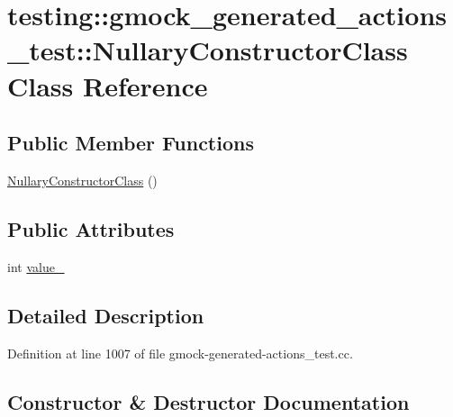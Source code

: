 \hypertarget{classtesting_1_1gmock__generated__actions__test_1_1_nullary_constructor_class}{}\section{testing\+:\+:gmock\+\_\+generated\+\_\+actions\+\_\+test\+:\+:Nullary\+Constructor\+Class Class Reference}
\label{classtesting_1_1gmock__generated__actions__test_1_1_nullary_constructor_class}
\subsection*{Public Member Functions}
\begin{DoxyCompactItemize}
\item 
\hyperlink{classtesting_1_1gmock__generated__actions__test_1_1_nullary_constructor_class_a8ad709e8d6c391958907dafea12d38a2}{Nullary\+Constructor\+Class} ()
\end{DoxyCompactItemize}
\subsection*{Public Attributes}
\begin{DoxyCompactItemize}
\item 
int \hyperlink{classtesting_1_1gmock__generated__actions__test_1_1_nullary_constructor_class_aa877ccc5aff335cbf81b8de90abee732}{value\+\_\+}
\end{DoxyCompactItemize}


\subsection{Detailed Description}


Definition at line 1007 of file gmock-\/generated-\/actions\+\_\+test.\+cc.



\subsection{Constructor \& Destructor Documentation}
